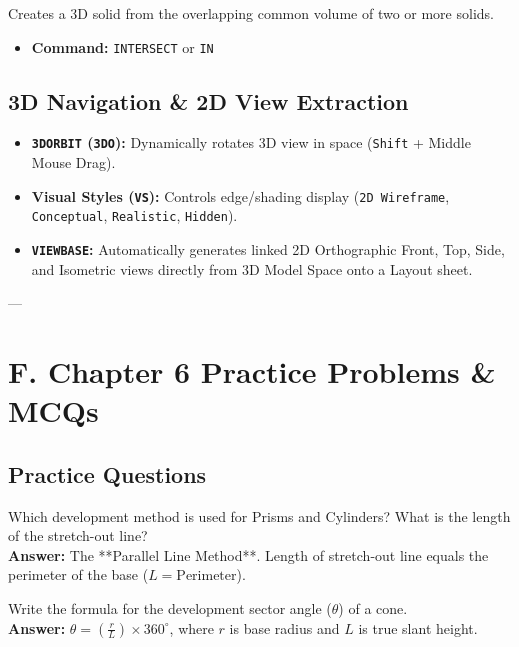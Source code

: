\begin{autocadcmd}[INTERSECT]
Creates a 3D solid from the overlapping common volume of two or more solids.
\begin{itemize}
    \item \textbf{Command:} \texttt{INTERSECT} or \texttt{IN}
\end{itemize}
\end{autocadcmd}

\subsection{3D Navigation \& 2D View Extraction}
\begin{itemize}
    \item \textbf{\texttt{3DORBIT} (\texttt{3DO}):} Dynamically rotates 3D view in space (\texttt{Shift} + Middle Mouse Drag).
    \item \textbf{Visual Styles (\texttt{VS}):} Controls edge/shading display (\texttt{2D Wireframe}, \texttt{Conceptual}, \texttt{Realistic}, \texttt{Hidden}).
    \item \textbf{\texttt{VIEWBASE}:} Automatically generates linked 2D Orthographic Front, Top, Side, and Isometric views directly from 3D Model Space onto a Layout sheet.
\end{itemize}

---

\section{F. Chapter 6 Practice Problems \& MCQs}

\subsection{Practice Questions}

\begin{vivaqa}
Which development method is used for Prisms and Cylinders? What is the length of the stretch-out line?\\[4pt]
\textbf{Answer:} The **Parallel Line Method**. Length of stretch-out line equals the perimeter of the base ($L = \text{Perimeter}$).
\end{vivaqa}

\begin{vivaqa}
Write the formula for the development sector angle ($\theta$) of a cone.\\[4pt]
\textbf{Answer:} $\theta = \left( \frac{r}{L} \right) \times 360^\circ$, where $r$ is base radius and $L$ is true slant height.
\end{vivaqa}

